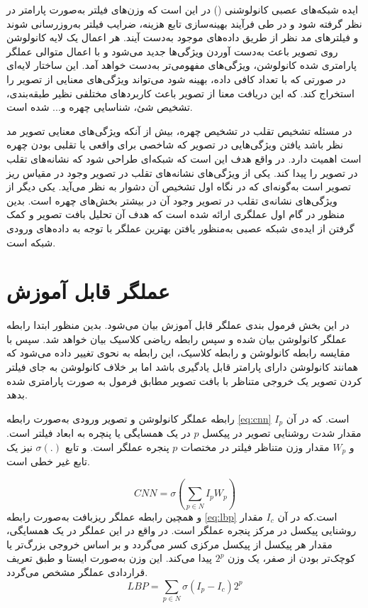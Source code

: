 ایده شبکه‌های عصبی کانولوشنی
 () 
در این است که وزن‌های فیلتر به‌صورت پارامتر در نظر گرفته شود و در طی فرآیند بهینه‌سازی تابع هزینه، ضرایب فیلتر به‌روزرسانی شوند و فیلترهای مد نظر از طریق داده‌های موجود به‌دست آیند. 
هر اعمال یک لایه کانولوشن روی تصویر باعث به‌دست آوردن ویژگی‌ها جدید می‌شود و با اعمال متوالی عملگر پارامتری شده کانولوشن، ویژگی‌های مفهومی‌تر به‌دست خواهد آمد. این ساختار لایه‌ای در صورتی که با تعداد کافی داده، بهینه شود می‌تواند ویژگی‌های معنایی از تصویر را استخراج کند. که این دریافت معنا از تصویر باعث کاربردهای مختلفی نظیر طبقه‌بندی، تشخیص شئ، شناسایی چهره و... شده است.

در مسئله تشخیص تقلب در تشخیص چهره، بیش از آنکه ویژگی‌های معنایی تصویر مد نظر باشد یافتن ویژگی‌هایی در تصویر که شاخصی برای واقعی یا تقلبی بودن چهره است اهمیت دارد. در واقع هدف این است که شبکه‌ای طراحی شود که نشانه‌های تقلب در تصویر را پیدا کند. یکی از ویژگی‌های نشانه‌های تقلب در تصویر وجود در مقیاس ریز تصویر است به‌گونه‌ای که در نگاه اول تشخیص آن دشوار به نظر می‌آید. یکی دیگر از ویژگی‌های نشانه‌ی تقلب در تصویر وجود آن در بیشتر بخش‌های چهره است. بدین منظور در گام اول عملگری ارائه شده است که هدف آن تحلیل بافت تصویر و کمک گرفتن از ایده‌ی شبکه عصبی به‌منظور یافتن بهترین عملگر با توجه به داده‌های ورودی شبکه است.

\section{عملگر  قابل آموزش}
در این بخش فرمول بندی عملگر 
قابل آموزش بیان می‌شود. بدین منظور ابتدا رابطه عملگر کانولوشن بیان شده و سپس رابطه ریاضی 
کلاسیک بیان خواهد شد. سپس با مقایسه رابطه کانولوشن و رابطه 
کلاسیک، این رابطه به نحوی تغییر داده می‌شود که همانند کانولوشن دارای پارامتر  قابل یادگیری باشد اما بر خلاف کانولوشن به جای فیلتر کردن تصویر یک خروجی متناظر با بافت تصویر مطابق فرمول 
به صورت پارامتری شده بدهد.

رابطه عملگر کانولوشن و تصویر ورودی به‌صورت رابطه 
\ref{eq:cnn}
است. که در آن 
$I_p$
مقدار شدت روشنایی تصویر در پیکسل $p$ در یک همسایگی یا پنچره به ابعاد فیلتر است. و 
 $W_p$
مقدار وزن متناظر فیلتر در مختصات $p$ پنجره عملگر است. و تابع
$\sigma(.)$  
نیز یک تابع غیر خطی است.

\begin{equation}\label{eq:cnn}
	CNN=\sigma(\sum_{p\in N}I_pW_p)
\end{equation}
و همچین رابطه عملگر ریزبافت
 به‌صورت رابطه
\ref{eq:lbp}
 است.که در آن
$I_c$
   مقدار روشنایی پیکسل در مرکز پنجره عملگر است. در واقع در این عملگر در یک همسایگی، مقدار هر پیکسل از پیکسل مرکزی کسر می‌گردد و بر اساس خروجی بزرگ‌تر یا کوچک‌تر بودن از صفر، یک وزن  
$2^p$   
   پیدا می‌کند. این وزن به‌صورت ایستا و طبق تعریف قراردادی عملگر مشخص می‌گردد.
\begin{equation}\label{eq:lbp}
	LBP=\sum_{p\in N}\sigma(I_p-I_c)2^p 
\end{equation}

